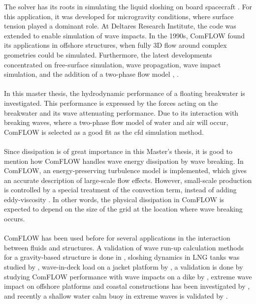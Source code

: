 The solver has its roots in simulating the liquid sloshing on board spacecraft \citep{veldman1984axisymmetric}. For this application, it was developed for microgravity conditions, where surface tension played a dominant role. At Deltares Research Institute, the code was extended to enable simulation of wave impacts. In the 1990s, ComFLOW found its applications in offshore structures, when fully 3D flow around complex geometries could be simulated. Furthermore, the latest developments concentrated on free-surface simulation, wave propagation, wave impact simulation, and the addition of a two-phase flow model \citep{Kleefsman2005}, \citep{Wemmenhove2008}. \\
\\
In this master thesis, the hydrodynamic performance of a floating breakwater is investigated. This performance is expressed by the forces acting on the breakwater and its wave attenuating performance. Due to its interaction with breaking waves, where a two-phase flow model of water and air will occur, ComFLOW is selected as a good fit as the \acrshort{cfd} simulation method. \\
\\
Since dissipation is of great importance in this Master's thesis, it is good to mention how ComFLOW handles wave energy dissipation by wave breaking. In ComFLOW, an energy-preserving turbulence model is implemented, which gives an accurate description of large-scale flow effects. However, small-scale production is controlled by a special treatment of the convection term, instead of adding eddy-viscosity \citep{Luppes2013}. In other words, the physical dissipation in ComFLOW is expected to depend on the size of the grid at the location where wave breaking occurs. \\
\\

ComFLOW has been used before for several applications in the interaction between fluids and structures. A validation of wave run-up calculation methods for a gravity-based structure is done in \citet{Danmeier2008}, sloshing dynamics in LNG tanks was studied by \citet{Wemmenhove2009}, wave-in-deck load on a jacket platform by \citet{Iwanowski2009}, a validation is done by studying ComFLOW performance with wave impacts on a dike by \citet{Wenneker2010}, extreme wave impact on offshore platforms and coastal constructions has been investigated by \citet{Luppes2011}, and recently a shallow water \acrfull{calm} buoy in extreme waves is validated by \citet{Bandringa2021}. 



